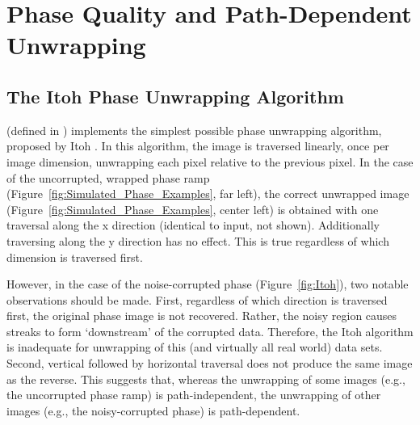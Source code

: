 \section{Phase Quality and Path-Dependent Unwrapping}

\subsection{The Itoh Phase Unwrapping Algorithm}

 (defined in ) implements the simplest possible phase unwrapping algorithm, proposed by Itoh \cite{Itoh1982}.  In this algorithm, the image is traversed linearly, once per image dimension, unwrapping each pixel relative to the previous pixel.  In the case of the uncorrupted, wrapped phase ramp (Figure~\ref{fig:Simulated_Phase_Examples}, far left), the correct unwrapped image (Figure~\ref{fig:Simulated_Phase_Examples}, center left) is obtained with one traversal along the x direction (identical to input, not shown).  Additionally traversing along the y direction has no effect.  This is true regardless of which dimension is traversed first.

However, in the case of the noise-corrupted phase (Figure~\ref{fig:Itoh}), two notable observations should be made.  First, regardless of which direction is traversed first, the original phase image is not recovered.  Rather, the noisy region causes streaks to form `downstream' of the corrupted data.  Therefore, the Itoh algorithm is inadequate for unwrapping of this (and virtually all real world) data sets.  Second,  vertical followed by horizontal traversal does not produce the same image as the reverse.  This suggests that, whereas the unwrapping of some images (e.g., the uncorrupted phase ramp) is path-independent, the unwrapping of other images (e.g., the noisy-corrupted phase) is path-dependent.

